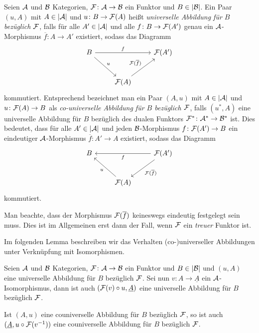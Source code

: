 \begin{defn}
  Seien $\mathcal{A}$ und $\mathcal{B}$ Kategorien, $\mathcal{F} \colon \mathcal{A} \to \mathcal{B}$ ein Funktor und $B \in |\mathcal{B}|$.
  Ein Paar $(u, A)$ mit $A \in |\mathcal{A}|$ und $u \colon B \to \mathcal{F}(A)$ heißt \emph{universelle Abbildung für $B$ bezüglich $\mathcal{F}$}, falls für alle $A' \in |\mathcal{A}|$ und alle $f \colon B \to \mathcal{F}(A')$ genau ein $\mathcal{A}$-Morphismus $\overline f \colon A \to A'$ existiert, sodass das Diagramm
  $$
  \begin{tikzcd}[row sep=2.5em]
    B \arrow[rd,"u"] \arrow[rr, "f"] &&\F(A') \\
    &\F(A) \arrow[ru, "\F(\overline{f})"]
  \end{tikzcd}
  $$
  kommutiert.
  Entsprechend bezeichnet man ein Paar $(A,u)$ mit $A \in |\mathcal{A}|$ und $u \colon \mathcal{F}(A) \to B$ als \emph{co-universelle Abbildung für $B$ bezüglich $\mathcal{F}$}, falls $(u^*, A)$ eine universelle Abbildung für $B$ bezüglich des dualen Funktors $\mathcal{F}^* \colon \mathcal{A}^* \to \mathcal{B}^*$ ist.
  Dies bedeutet, dass für alle $A' \in |\mathcal{A}|$ und jeden $\mathcal{B}$-Morphismus $f \colon \mathcal{F}(A') \to B$ ein eindeutiger $\mathcal{A}$-Morphismus $\overline f \colon A' \to A$ existiert, sodass das Diagramm
  $$
  \begin{tikzcd}[row sep=2.5em]
    B  &&  \arrow[ll, "f"] \F(A')\arrow[ld, "\F(\overline{f})"]  \\
    & \arrow[lu,"u"]\F(A) & 
  \end{tikzcd}
  $$
  kommutiert.
\end{defn}

Man beachte, dass der Morphismus $\mathcal{F}(\overline f)$ keineswegs eindeutig festgelegt sein muss. Dies ist im Allgemeinen erst dann der Fall, wenn $\mathcal{F}$ ein \emph{treuer} Funktor ist.

Im folgenden Lemma beschreiben wir das Verhalten (co-)universeller Abbildungen unter Verknüpfung mit Isomorphismen.

\begin{lem}
  \label{lem:universalCircIso}
  Seien $\mathcal{A}$ und $\mathcal{B}$ Kategorien, $\mathcal{F} \colon \mathcal{A} \to \mathcal{B}$ ein Funktor und $B \in |\mathcal{B}|$ und $(u,A)$ eine universelle Abbildung für $B$ bezüglich $\mathcal{F}$.
  Sei nun $v \colon A \to \underline A$ ein $\mathcal{A}$-Isomorphismus, dann ist auch $(\mathcal{F}(v) \circ u, \underline A )$ eine universelle Abbildung für $B$ bezüglich $\mathcal{F}$.

  Ist $(A, u)$ eine couniverselle Abbildung für $B$ bezüglich $\mathcal{F}$, so ist auch $(\underline A, u \circ \mathcal{F}(v^{-1}))$ eine couniverselle Abbildung für $B$ bezüglich $\mathcal{F}$.
\end{lem}

